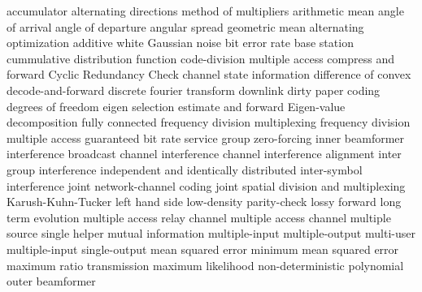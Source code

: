 
 {accumulator}
 {alternating directions method of multipliers}
   {arithmetic mean}
 {angle of arrival}
 {angle of departure}
 {angular spread}
   {geometric mean}
   {alternating optimization}
   {additive white Gaussian noise}
   {bit error rate}
   {base station}
 {cummulative distribution function}
   {code-division multiple access}
 {compress and forward}
 {Cyclic Redundancy Check}
   {channel state information}
 {difference of convex}
 {decode-and-forward}
 {discrete fourier transform}
   {downlink}
   {dirty paper coding}
   {degrees of freedom}
 	{eigen selection}
 {estimate and forward }
 {Eigen-value decomposition}
 {fully connected}
   {frequency division multiplexing}
   {frequency division multiple access}
   {guaranteed bit rate service}
 {group zero-forcing}
 {inner beamformer}
   {interference broadcast channel}
   {interference channel}
   {interference alignment}
 {inter group interference} 
   {independent and identically distributed}
   {inter-symbol interference}
 {joint network-channel coding}
 {joint spatial division and multiplexing}
   {Karush-Kuhn-Tucker}
 {left hand side}
 {low-density parity-check}
 {lossy forward}
   {long term evolution}
 {multiple access relay channel}
 {multiple access channel}
 {multiple source single helper}
 {mutual information}
   {multiple-input multiple-output}
   {multi-user}
   {multiple-input single-output}
   {mean squared error}
   {minimum mean squared error}
   {maximum ratio transmission}
   {maximum likelihood}
   {non-deterministic polynomial}
 {outer beamformer}
